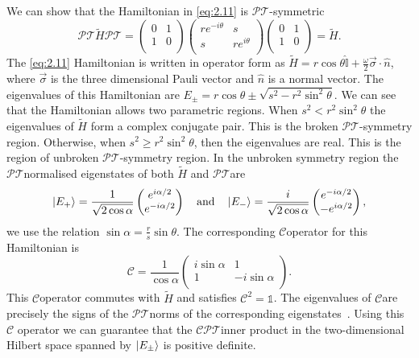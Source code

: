 \documentclass[12pt, a4paper]{report}
\newcommand\PT{\(\mathcal{PT}\)}
\newcommand\CC{\(\mathcal{C}\)}
\begin{document}
We can show that the Hamiltonian in \ref{eq:2.11} is \PT-symmetric
\begin{equation*}
\mathcal{PT}\tilde{H}\mathcal{PT} =\begin{pmatrix}
0 & 1  \\
1 & 0 \\
\end{pmatrix}
\begin{pmatrix}
re^{-i\theta} & s  \\
s & re^{i\theta} \\
\end{pmatrix}
\begin{pmatrix}
0 & 1  \\
1 & 0 \\
\end{pmatrix} = \tilde{H}.
\end{equation*}
The \ref{eq:2.11} Hamiltonian is written in operator form as $\tilde{H} = r\cos\theta \hat{\mathbb{I}} + \frac{\omega}{2} \vec{\sigma}\cdot\hat{n}$, where $\vec{\sigma}$ is the three dimensional Pauli vector and $\hat{n}$ is a normal vector. The eigenvalues of this Hamiltonian are $E_{\pm} = r\cos\theta \pm \sqrt{s^2 - r^2\sin^2\theta}$. We can see that the Hamiltonian allows two parametric regions. When $s^2 < r^2\sin^2\theta$ the eigenvalues of $\tilde{H}$ form a complex conjugate pair. This is the broken \PT-symmetry region. Otherwise, when $s^2 \geq r^2\sin^2\theta$, then the eigenvalues are real. This is the region of unbroken \PT-symmetry region. In the unbroken symmetry region the \PT\:normalised eigenstates of both $\tilde{H}$ and \PT\:are
\begin{equation}\label{eq:2.13}
\ket{E_{+}} = \frac{1}{\sqrt{2\cos\alpha}}\begin{pmatrix}
e^{i\alpha/2} \\
e^{-i\alpha/2} \\
\end{pmatrix}\quad\mathrm{and}\quad\ket{E_{-}} = \frac{i}{\sqrt{2\cos\alpha}}\begin{pmatrix}
e^{-i\alpha/2} \\
-e^{i\alpha/2} \\
\end{pmatrix},
\end{equation}
we use the relation $\sin\alpha = \frac{r}{s}\sin\theta$. The corresponding \CC\:operator for this Hamiltonian is 
\begin{equation}\label{eq:2.14}
\mathcal{C} = \frac{1}{\cos\alpha}\begin{pmatrix}
i\sin\alpha & 1 \\
1 & -i\sin\alpha\\
\end{pmatrix}.
\end{equation}
This \CC\:operator commutes with $\tilde{H}$ and satisfies $\mathcal{C}^2= \mathds{1}$. The eigenvalues of \CC\:are precisely the signs of the \PT\:norms of the corresponding eigenstates~\cite{Bender_2004}. Using this \CC\: operator we can guarantee that the \CC\PT\:inner product in the two-dimensional Hilbert space spanned by $\ket{E_{\pm}}$ is positive definite.
\end{document}
